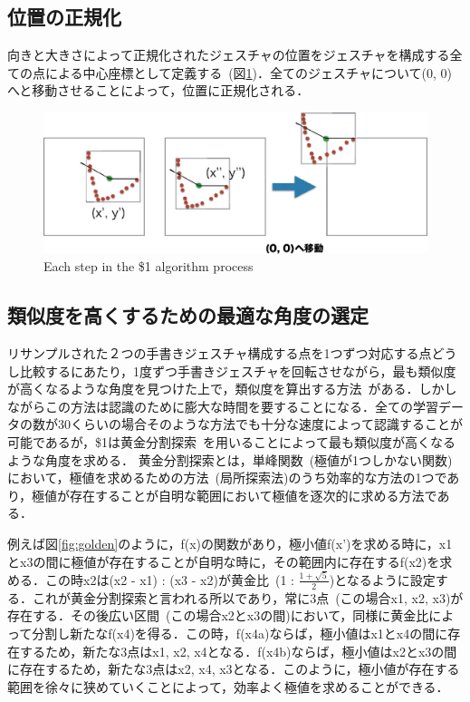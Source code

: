 \subsection{位置の正規化}
向きと大きさによって正規化されたジェスチャの位置をジェスチャを構成する全ての点による中心座標として定義する~(図\ref{fig:position})．全てのジェスチャについて(0, 0)へと移動させることによって，位置に正規化される．

\begin{figure} [!h]
\centering
\includegraphics [width=0.8\columnwidth]{img/position.eps}
\caption{Each step in the \$1 algorithm process}
\label{fig:position}
\end{figure}

\subsection{類似度を高くするための最適な角度の選定}
リサンプルされた２つの手書きジェスチャ構成する点を1つずつ対応する点どうし比較するにあたり，1度ずつ手書きジェスチャを回転させながら，最も類似度が高くなるような角度を見つけた上で，類似度を算出する方法~\cite{Kara:2005:ITS:1652319.1652712}がある．しかしながらこの方法は認識のために膨大な時間を要することになる．全ての学習データの数が30くらいの場合そのような方法でも十分な速度によって認識することが可能であるが，\$1は黄金分割探索~\cite{Press:1992:NRC:148286}を用いることによって最も類似度が高くなるような角度を求める．
黄金分割探索とは，単峰関数~(極値が1つしかない関数)において，極値を求めるための方法~(局所探索法)のうち効率的な方法の1つであり，極値が存在することが自明な範囲において極値を逐次的に求める方法である．

例えば図\ref{fig:golden}のように，f(x)の関数があり，極小値f(x')を求める時に，x1とx3の間に極値が存在することが自明な時に，その範囲内に存在するf(x2)を求める．この時x2は(x2 - x1) : (x3 - x2)が黄金比~(1 : $\frac{1+\sqrt{5}}{2}$)となるように設定する．これが黄金分割探索と言われる所以であり，常に3点~(この場合x1, x2, x3)が存在する．その後広い区間~(この場合x2とx3の間)において，同様に黄金比によって分割し新たなf(x4)を得る．この時，f(x4a)ならば，極小値はx1とx4の間に存在するため，新たな3点はx1, x2, x4となる．f(x4b)ならば，極小値はx2とx3の間に存在するため，新たな3点はx2, x4, x3となる．このように，極小値が存在する範囲を徐々に狭めていくことによって，効率よく極値を求めることができる．

